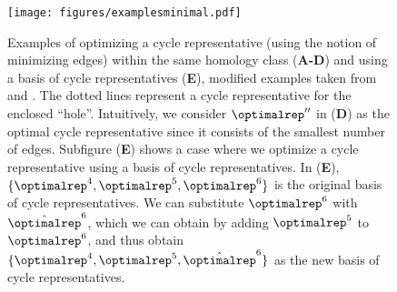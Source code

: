 \begin{figure}[h!]
\begin{center}
\texttt{[image: figures/examplesminimal.pdf]}%
\end{center}
\caption{Examples of optimizing a cycle representative (using the notion of minimizing edges) within the same homology class (\textbf{A-D}) and using a basis of cycle representatives (\textbf{E}), modified examples taken from \cite{Escolar2016} and \cite{Obayashi2018}. The dotted lines represent a cycle representative for the enclosed ``hole''. Intuitively, we consider $\optimalrep''$ in (\textbf{D}) as the optimal cycle representative since it consists of the smallest number of edges. Subfigure (\textbf{E}) shows a case where we optimize a cycle representative using a basis of cycle representatives. In (\textbf{E}), $\{\optimalrep^4, \optimalrep^5, \optimalrep^6\}$ is the original basis of cycle representatives. We can substitute $\optimalrep^6$ with $\hat{\optimalrep}^6$, which we can obtain by adding $\optimalrep^5$ to $\optimalrep^6$, and thus obtain $\{\optimalrep^4, \optimalrep^5, \hat{\optimalrep}^6\}$ as the new basis of cycle representatives.}\label{fig:example-optimal}
\end{figure}
